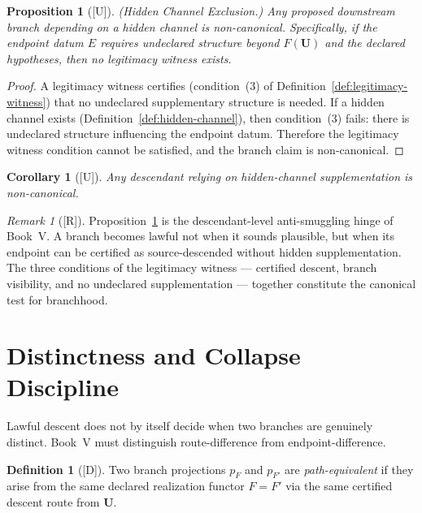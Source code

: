 \documentclass[12pt,oneside]{amsbook}
\theoremstyle{plain}
\newtheorem{proposition}[theorem]{Proposition}
\newtheorem{corollary}[theorem]{Corollary}
\theoremstyle{definition}
\newtheorem{definition}[theorem]{Definition}
\theoremstyle{remark}
\newtheorem{remark}[theorem]{Remark}
\newcommand{\status}[1]{\textup{[#1]}}
\begin{document}
\begin{proposition}[\status{U}]\label{prop:hidden-channel-exclusion}
\textup{(Hidden Channel Exclusion.)}  Any proposed downstream branch
depending on a hidden channel is non-canonical.  Specifically, if the
endpoint datum $E$ requires undeclared structure beyond $F(\mathbf{U})$
and the declared hypotheses, then no legitimacy witness exists.
\end{proposition}

\begin{proof}
A legitimacy witness certifies (condition~(3) of
Definition~\ref{def:legitimacy-witness}) that no undeclared
supplementary structure is needed.  If a hidden channel exists
(Definition~\ref{def:hidden-channel}), then condition~(3) fails:
there is undeclared structure influencing the endpoint datum.
Therefore the legitimacy witness condition cannot be satisfied, and
the branch claim is non-canonical.
\end{proof}

\begin{corollary}[\status{U}]\label{cor:hidden-channel-non-canonical}
Any descendant relying on hidden-channel supplementation is
non-canonical.
\end{corollary}

\begin{remark}[\status{R}]\label{rmk:hidden-channel-anti-smuggling}
Proposition~\ref{prop:hidden-channel-exclusion} is the descendant-level
anti-smuggling hinge of Book~V.  A branch becomes lawful not when it
sounds plausible, but when its endpoint can be certified as
source-descended without hidden supplementation.  The three conditions
of the legitimacy witness --- certified descent, branch visibility,
and no undeclared supplementation --- together constitute the canonical
test for branchhood.
\end{remark}

\section{Distinctness and Collapse Discipline}

Lawful descent does not by itself decide when two branches are
genuinely distinct.  Book~V must distinguish route-difference from
endpoint-difference.

\begin{definition}[\status{D}]\label{def:path-equiv}
Two branch projections $p_F$ and $p_{F'}$ are \emph{path-equivalent}
if they arise from the same declared realization functor $F = F'$ via
the same certified descent route from $\mathbf{U}$.
\end{definition}
\end{document}
